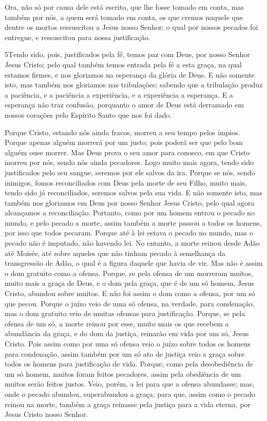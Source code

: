 Ora, não só por causa dele está escrito, que lhe fosse tomado em
conta, mas também por nós, a quem será tomado em conta, os
que cremos naquele que dentre os mortos ressuscitou a Jesus nosso
Senhor; o qual por nossos pecados foi entregue, e ressuscitou
para nossa justificação.

\medskip

\lettrine{5} Tendo sido, pois, justificados pela fé, temos paz
com Deus, por nosso Senhor Jesus Cristo; pelo qual também temos
entrada pela fé a esta graça, na qual estamos firmes, e nos
gloriamos na esperança da glória de Deus. E não somente isto,
mas também nos gloriamos nas tribulações; sabendo que a tribulação
produz a paciência, e a paciência a experiência, e a experiência
a esperança. E a esperança não traz confusão, porquanto o amor
de Deus está derramado em nossos corações pelo Espírito Santo que
nos foi dado.

Porque Cristo, estando nós ainda fracos, morreu a seu tempo pelos
ímpios. Porque apenas alguém morrerá por um justo; pois poderá
ser que pelo bom alguém ouse morrer. Mas Deus prova o seu amor
para conosco, em que Cristo morreu por nós, sendo nós ainda
pecadores. Logo muito mais agora, tendo sido justificados pelo
seu sangue, seremos por ele salvos da ira. Porque se nós,
sendo inimigos, fomos reconciliados com Deus pela morte de seu
Filho, muito mais, tendo sido já reconciliados, seremos salvos pela
sua vida. E não somente isto, mas também nos gloriamos em
Deus por nosso Senhor Jesus Cristo, pelo qual agora alcançamos a
reconciliação. Portanto, como por um homem entrou o pecado no
mundo, e pelo pecado a morte, assim também a morte passou a todos os
homens, por isso que todos pecaram. Porque até à lei estava o
pecado no mundo, mas o pecado não é imputado, não havendo lei.
No entanto, a morte reinou desde Adão até Moisés, até sobre
aqueles que não tinham pecado à semelhança da transgressão de Adão,
o qual é a figura daquele que havia de vir. Mas não é assim o
dom gratuito como a ofensa. Porque, se pela ofensa de um morreram
muitos, muito mais a graça de Deus, e o dom pela graça, que é de um
só homem, Jesus Cristo, abundou sobre muitos. E não foi assim
o dom como a ofensa, por um só que pecou. Porque o juízo veio de uma
só ofensa, na verdade, para condenação, mas o dom gratuito veio de
muitas ofensas para justificação. Porque, se pela ofensa de
um só, a morte reinou por esse, muito mais os que recebem a
abundância da graça, e do dom da justiça, reinarão em vida por um
só, Jesus Cristo. Pois assim como por uma só ofensa veio o
juízo sobre todos os homens para condenação, assim também por um só
ato de justiça veio a graça sobre todos os homens para justificação
de vida. Porque, como pela desobediência de um só homem,
muitos foram feitos pecadores, assim pela obediência de um muitos
serão feitos justos. Veio, porém, a lei para que a ofensa
abundasse; mas, onde o pecado abundou, superabundou a graça;
para que, assim como o pecado reinou na morte, também a graça
reinasse pela justiça para a vida eterna, por Jesus Cristo nosso
Senhor.


